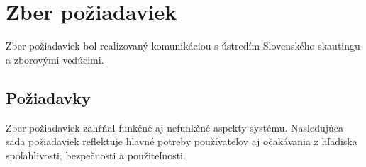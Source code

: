 \section{Zber požiadaviek}
Zber požiadaviek bol realizovaný komunikáciou s ústredím Slovenského skautingu a zborovými vedúcimi.

\subsection{Požiadavky}
Zber požiadaviek zahŕňal funkčné aj nefunkčné aspekty systému. Nasledujúca sada požiadaviek reflektuje hlavné potreby používateľov aj očakávania z hľadiska spoľahlivosti, bezpečnosti a použiteľnosti.


\newcommand{\requirement}[5]{
    \item \label{#1} \textbf{#2}\\
    FURPS+: #3\\
    MoSCoW: #4\\
    #5
}

